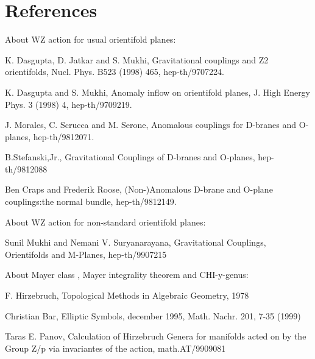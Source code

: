 \documentclass[a4paper,a4paper]{article}
\begin{document}
\section{References}

\setlength{\baselineskip}{20pt}
About WZ action for usual orientifold planes:

K. Dasgupta, D. Jatkar and S. Mukhi, Gravitational couplings and Z2 orientifolds, Nucl. Phys. B523 (1998) 465, hep-th/9707224.

K. Dasgupta and S. Mukhi, Anomaly inflow on orientifold planes, J. High Energy Phys. 3 (1998) 4, hep-th/9709219.

J. Morales, C. Scrucca and M. Serone, Anomalous couplings for D-branes and O-planes, hep-th/9812071.

B.Stefanski,Jr., Gravitational Couplings of D-branes and O-planes, hep-th/9812088

Ben Craps and Frederik Roose, (Non-)Anomalous D-brane and O-plane couplings:the normal bundle,  hep-th/9812149.

About WZ action for non-standard orientifold planes:

Sunil Mukhi and Nemani V. Suryanarayana,  Gravitational Couplings, Orientifolds and M-Planes,  hep-th/9907215


About Mayer class , Mayer integrality theorem and CHI-y-genus:

F. Hirzebruch, Topological Methods in Algebraic Geometry, 1978

Christian Bar,  Elliptic Symbols, december 1995, Math. Nachr. 201, 7-35 (1999)

Taras E. Panov,  Calculation of Hirzebruch Genera for manifolds acted on by the Group Z/p via invariantes of the action, math.AT/9909081

\setlength{\baselineskip}{50pt}   
\end{document}
